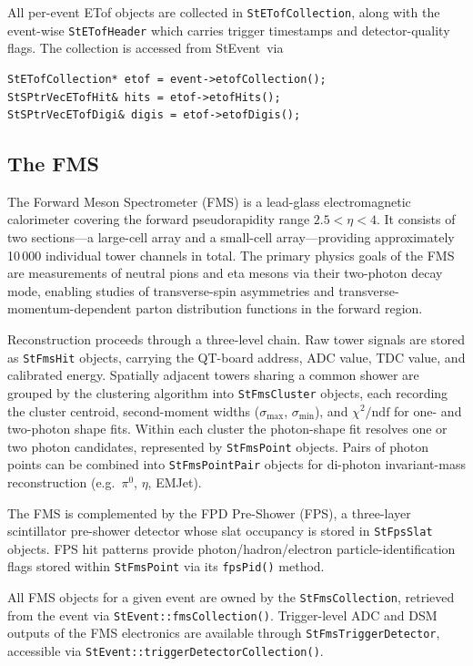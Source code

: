 \documentclass[twoside]{article}
\newcommand{\StEvent}{\textsf{StEvent}}
\begin{document}
All per-event ETof objects are collected in \texttt{StETofCollection}, along
with the event-wise \texttt{StETofHeader} which carries trigger timestamps
and detector-quality flags.  The collection is accessed from \StEvent\ via
\begin{verbatim}
StETofCollection* etof = event->etofCollection();
StSPtrVecETofHit& hits = etof->etofHits();
StSPtrVecETofDigi& digis = etof->etofDigis();
\end{verbatim}

\subsection{The FMS}
The Forward Meson Spectrometer (FMS) is a lead-glass electromagnetic calorimeter
covering the forward pseudorapidity range $2.5 < \eta < 4$.  It consists of two
sections---a large-cell array and a small-cell array---providing approximately
10\,000 individual tower channels in total.  The primary physics goals of the FMS
are measurements of neutral pions and eta mesons via their two-photon decay mode,
enabling studies of transverse-spin asymmetries and transverse-momentum-dependent
parton distribution functions in the forward region.

Reconstruction proceeds through a three-level chain.  Raw tower signals are stored
as \texttt{StFmsHit} objects, carrying the QT-board address, ADC value, TDC value,
and calibrated energy.  Spatially adjacent towers sharing a common shower are
grouped by the clustering algorithm into \texttt{StFmsCluster} objects, each
recording the cluster centroid, second-moment widths ($\sigma_{\max}$,
$\sigma_{\min}$), and $\chi^{2}/\text{ndf}$ for one- and two-photon shape fits.
Within each cluster the photon-shape fit resolves one or two photon candidates,
represented by \texttt{StFmsPoint} objects.  Pairs of photon points can be
combined into \texttt{StFmsPointPair} objects for di-photon invariant-mass
reconstruction (e.g.\ $\pi^{0}$, $\eta$, EMJet).

The FMS is complemented by the FPD Pre-Shower (FPS), a three-layer scintillator
pre-shower detector whose slat occupancy is stored in \texttt{StFpsSlat} objects.
FPS hit patterns provide photon/hadron/electron particle-identification flags
stored within \texttt{StFmsPoint} via its \texttt{fpsPid()} method.

All FMS objects for a given event are owned by the \texttt{StFmsCollection},
retrieved from the event via
\verb+StEvent::fmsCollection()+.  Trigger-level ADC and DSM outputs of the FMS
electronics are available through \texttt{StFmsTriggerDetector}, accessible via
\texttt{StEvent::triggerDetectorCollection()}.
\end{document}
